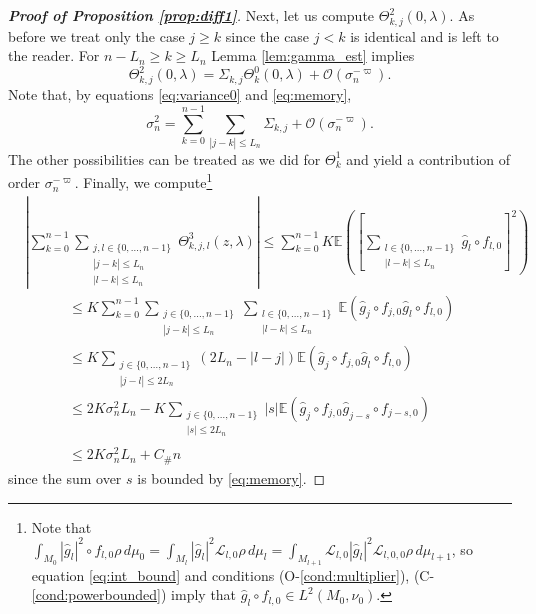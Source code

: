 \documentclass{amsart}
\numberwithin{equation}{section}
\newcommand\cL{{\mathcal L}}
\newcommand\cO{{\mathcal O}}
\newcommand\bE{{\mathbb E}}
\newcommand{\Const}{C_{\#}}
\begin{document}
\begin{proof}[\bf \em Proof of Proposition \ref{prop:diff1}]
Next, let us compute $\Theta^2_{k,j}(0,\lambda)$. As before we treat only the case $j\geq k$ since the case $j< k$ is identical and is left to the reader.\newline
For $n-L_n\geq k\geq L_n$  Lemma \ref{lem:gamma_est} implies
\begin{equation}\label{eq:theta2}
\Theta^2_{k,j}(0,\lambda)=\Sigma_{k, j}\Theta^0_k(0,\lambda)+\cO(\sigma_n^{-\varpi}).
\end{equation}
Note that, by equations \eqref{eq:variance0} and \eqref{eq:memory},
\begin{equation}\label{eq:variance_tot}
\sigma_n^2=\sum_{k=0}^{n-1}\sum_{|j-k|\leq L_n}\Sigma_{k,j}+\cO(\sigma_n^{-\varpi}).
\end{equation}
The other possibilities can be treated as we did for $\Theta^1_k$ and yield a contribution of order $\sigma_n^{-\varpi}$.
Finally, we compute\footnote{ Note that $\int_{M_0} |\hat g_l|^2\circ f_{l,0} \rho\, d\mu_0=\int_{M_l}|\hat g_l|^2 \cL_{l,0} \rho\, d\mu_l=\int_{M_{l+1}}\cL_{l,0}|\hat g_l|^2 \cL_{l,0,0} \rho\, d\mu_{l+1}$, so equation \eqref{eq:int_bound} and conditions (O-\ref{cond:multiplier}), (C-\ref{cond:powerbounded}) imply that $\hat g_l\circ f_{l,0}\in L^2(M_0,\nu_0)$. }
\begin{equation}\label{eq:rem_tay3}
\begin{split}
&\left|\sum_{k=0}^{n-1}\sum_{\substack{ j,l\in\{0,\dots, n-1\}\\ |j-k|\leq L_n\\ |l-k|\leq L_n}}\Theta^3_{k,j,l}(z,\lambda)\right|\leq \sum_{k=0}^{n-1} K\bE\left(\left[\sum_{\substack{ l\in\{0,\dots, n-1\}\\ |l-k|\leq L_n}}\hat g_l\circ f_{l,0}\right]^2\right)\\
&\phantom{\sum_{k=0}^{n-1}}
\leq K \sum_{k=0}^{n-1} \sum_{\substack{ j \in\{0,\dots, n-1\}\\ |j-k|\leq L_n}}\sum_{\substack{ l\in\{0,\dots, n-1\}\\ |l-k|\leq L_n}}\bE\left(\hat g_j\circ f_{j,0}\hat g_l\circ f_{l,0}\right)\\
&\phantom{\sum_{k=0}^{n-1}}
\leq K \sum_{\substack{ j\in\{0,\dots, n-1\}\\ |j-l|\leq 2L_n}} (2L_n-|l-j|)\bE\left(\hat g_j\circ f_{j,0}\hat g_l\circ f_{l,0}\right)\\
&\phantom{\sum_{k=0}^{n-1}}
\leq 2K\sigma_n^2 L_n-K \sum_{\substack{ j\in\{0,\dots, n-1\}\\ |s|\leq 2L_n}} |s|\bE\left(\hat g_j\circ f_{j,0}\hat g_{j-s}\circ f_{j-s,0}\right)\\
&\phantom{\sum_{k=0}^{n-1}}  
\leq 2K\sigma_n^2 L_n+\Const n
\end{split}
\end{equation}
since the sum over $s$ is bounded by \eqref{eq:memory}.


\end{proof}
\end{document}
